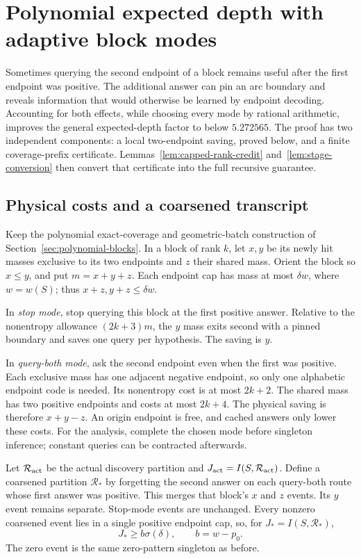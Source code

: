 \section{Polynomial expected depth with adaptive block modes}
\label{sec:adaptive-blocks}

Sometimes querying the second endpoint of a block remains useful after
the first endpoint was positive. The additional answer can pin an arc
boundary and reveals information that would otherwise be learned by
endpoint decoding. Accounting for both effects, while choosing every
mode by rational arithmetic, improves the general expected-depth factor
to below $5.272565$. The proof has two independent components:
a local two-endpoint saving, proved below, and a finite coverage-prefix
certificate. Lemmas~\ref{lem:capped-rank-credit}
and~\ref{lem:stage-conversion} then convert that certificate into
the full recursive guarantee.

\subsection{Physical costs and a coarsened transcript}

Keep the polynomial exact-coverage and geometric-batch construction of
Section~\ref{sec:polynomial-blocks}. In a block of rank $k$, let $x,y$
be its newly hit masses exclusive to its two endpoints and $z$ their
shared mass. Orient the block so $x\le y$, and put $m=x+y+z$.
Each endpoint cap has mass at most $\delta w$, where $w=w(S)$;
thus $x+z,y+z\le\delta w$.

In \emph{stop mode}, stop querying this block at the first positive
answer. Relative to the nonentropy allowance $(2k+3)m$, the $y$ mass
exits second with a pinned boundary and saves one query per hypothesis.
The saving is $y$.

In \emph{query-both mode}, ask the second endpoint even when the first
was positive. Each exclusive mass has one adjacent negative endpoint,
so only one alphabetic endpoint code is needed. Its nonentropy cost
is at most $2k+2$. The shared mass has two positive endpoints and
costs at most $2k+4$. The physical saving is therefore $x+y-z$.
An origin endpoint is free, and cached answers only lower these costs.
For the analysis, complete the chosen mode before singleton inference;
constant queries can be contracted afterwards.

Let $\mathcal R_{\rm act}$ be the actual discovery partition and
$J_{\rm act}=I(S,\mathcal R_{\rm act})$. Define a coarsened
partition $\mathcal R_*$ by forgetting the second answer on each
query-both route whose first answer was positive. This merges that
block's $x$ and $z$ events. Its $y$ event remains separate. Stop-mode
events are unchanged. Every nonzero coarsened event lies in a single
positive endpoint cap, so, for $J_*=I(S,\mathcal R_*)$,
\begin{equation}\label{eq:coarse-discovery-cap}
 J_*\ge b\sigma(\delta),\qquad b=w-p_0.
\end{equation}
The zero event is the same zero-pattern singleton as before.

